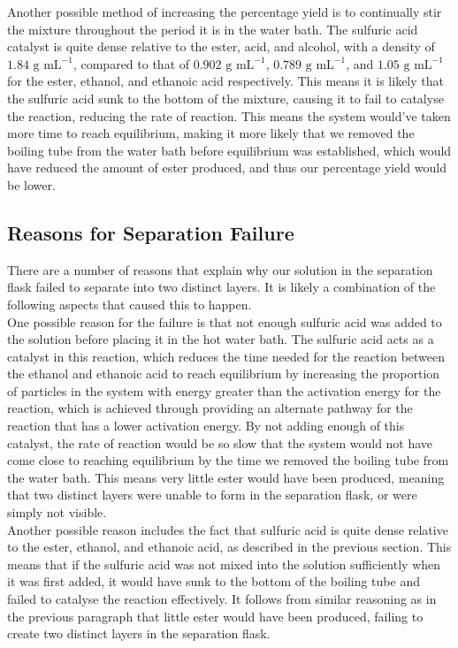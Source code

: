 \documentclass[a4paper,11pt]{article}
\begin{document}
Another possible method of increasing the percentage yield is to continually
stir the mixture throughout the period it is in the water bath. The sulfuric
acid catalyst is quite dense relative to the ester, acid, and alcohol, with a density of
$1.84\mbox{ g mL}^{-1}$, compared to that of $0.902\mbox{ g mL}^{-1}$,
$0.789\mbox{ g mL}^{-1}$, and $1.05\mbox{ g mL}^{-1}$ for the ester, ethanol,
and ethanoic acid respectively. This means it is likely that the sulfuric acid
sunk to the bottom of the mixture, causing it to fail to catalyse the
reaction, reducing the rate of reaction. This means the
system would've taken more time to reach equilibrium, making it more likely that
we removed the boiling tube from the water bath before equilibrium was
established, which
would have reduced the amount of ester produced, and thus our percentage yield
would be lower.


\subsection{Reasons for Separation Failure}

There are a number of reasons that explain why our solution in the separation
flask failed to separate into two distinct layers. It is likely a combination of
the following aspects that caused this to happen. \\

One possible reason for the failure is that not enough sulfuric acid was added
to the solution before placing it in the hot water bath. The sulfuric acid acts
as a catalyst in this reaction, which reduces the time needed for the reaction
between the ethanol and ethanoic acid to reach equilibrium by increasing the
proportion of particles in the system with energy greater than the
activation energy for the reaction, which is achieved through providing an
alternate pathway for the reaction that has a lower activation energy. By not
adding enough of this catalyst, the rate of reaction would be so slow that the
system would not have come close to reaching equilibrium by the time we removed
the boiling tube from the water bath. This means very little ester would have
been produced, meaning that two distinct layers were unable to form in the
separation flask, or were simply not visible. \\

Another possible reason includes the fact that sulfuric acid is quite dense
relative to the ester, ethanol, and ethanoic acid, as described in the previous
section. This means that if the sulfuric acid was not
mixed into the solution sufficiently when it was first added, it would have sunk
to the bottom of the boiling tube and failed to catalyse the reaction
effectively. It follows from similar reasoning as in the previous paragraph that
little ester would have been produced, failing to create two distinct layers in
the separation flask. \\
\end{document}
